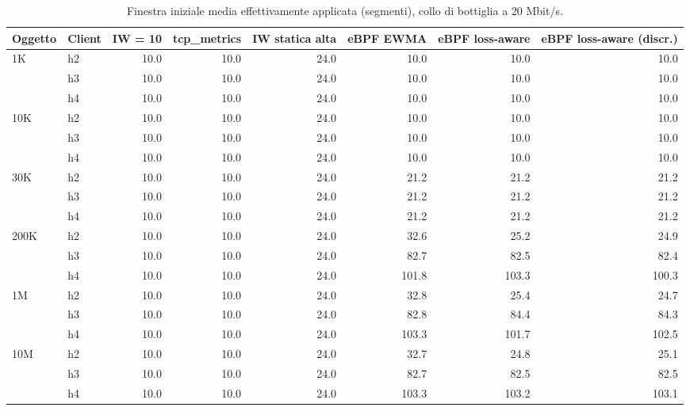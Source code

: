 \begin{table}[htbp]
  \centering
  \caption{Finestra iniziale media effettivamente applicata (segmenti), collo di bottiglia a 20 Mbit/s.}
  \label{tab:iw-20}
  \begin{tabular}{llrrrrrr}
    \toprule
    Oggetto & Client & IW = 10 & tcp\_metrics & IW statica alta & eBPF EWMA & eBPF loss-aware & eBPF loss-aware (discr.) \\
    \midrule
    1K & h2 & 10.0 & 10.0 & 24.0 & 10.0 & 10.0 & 10.0 \\
     & h3 & 10.0 & 10.0 & 24.0 & 10.0 & 10.0 & 10.0 \\
     & h4 & 10.0 & 10.0 & 24.0 & 10.0 & 10.0 & 10.0 \\
    \addlinespace
    10K & h2 & 10.0 & 10.0 & 24.0 & 10.0 & 10.0 & 10.0 \\
     & h3 & 10.0 & 10.0 & 24.0 & 10.0 & 10.0 & 10.0 \\
     & h4 & 10.0 & 10.0 & 24.0 & 10.0 & 10.0 & 10.0 \\
    \addlinespace
    30K & h2 & 10.0 & 10.0 & 24.0 & 21.2 & 21.2 & 21.2 \\
     & h3 & 10.0 & 10.0 & 24.0 & 21.2 & 21.2 & 21.2 \\
     & h4 & 10.0 & 10.0 & 24.0 & 21.2 & 21.2 & 21.2 \\
    \addlinespace
    200K & h2 & 10.0 & 10.0 & 24.0 & 32.6 & 25.2 & 24.9 \\
     & h3 & 10.0 & 10.0 & 24.0 & 82.7 & 82.5 & 82.4 \\
     & h4 & 10.0 & 10.0 & 24.0 & 101.8 & 103.3 & 100.3 \\
    \addlinespace
    1M & h2 & 10.0 & 10.0 & 24.0 & 32.8 & 25.4 & 24.7 \\
     & h3 & 10.0 & 10.0 & 24.0 & 82.8 & 84.4 & 84.3 \\
     & h4 & 10.0 & 10.0 & 24.0 & 103.3 & 101.7 & 102.5 \\
    \addlinespace
    10M & h2 & 10.0 & 10.0 & 24.0 & 32.7 & 24.8 & 25.1 \\
     & h3 & 10.0 & 10.0 & 24.0 & 82.7 & 82.5 & 82.5 \\
     & h4 & 10.0 & 10.0 & 24.0 & 103.3 & 103.2 & 103.1 \\
    \bottomrule
  \end{tabular}
\end{table}
